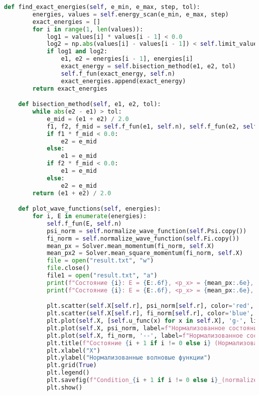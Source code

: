 \begin{lstlisting}[language=Python, caption=Код файла solver.py,label={lst:solver}]
    def find_exact_energies(self, e_min, e_max, step, tol):
        energies, values = self.energy_scan(e_min, e_max, step)
        exact_energies = []
        for i in range(1, len(values)):
            log1 = values[i] * values[i - 1] < 0.0
            log2 = np.abs(values[i] - values[i - 1]) < self.limit_value
            if log1 and log2:
                e1, e2 = energies[i - 1], energies[i]
                exact_energy = self.bisection_method(e1, e2, tol)
                self.f_fun(exact_energy, self.n)
                exact_energies.append(exact_energy)
        return exact_energies

    def bisection_method(self, e1, e2, tol):
        while abs(e2 - e1) > tol:
            e_mid = (e1 + e2) / 2.0
            f1, f2, f_mid = self.f_fun(e1, self.n), self.f_fun(e2, self.n), self.f_fun(e_mid, self.n)
            if f1 * f_mid < 0.0:
                e2 = e_mid
            else:
                e1 = e_mid
            if f2 * f_mid < 0.0:
                e1 = e_mid
            else:
                e2 = e_mid
        return (e1 + e2) / 2.0

    def plot_wave_functions(self, energies):
        for i, E in enumerate(energies):
            self.f_fun(E, self.n)
            psi_norm = self.normalize_wave_function(self.Psi.copy())
            fi_norm = self.normalize_wave_function(self.Fi.copy())
            mean_px = Solver.mean_momentum(fi_norm, self.X)
            mean_px2 = Solver.mean_square_momentum(fi_norm, self.X)
            file = open("result.txt", "w")
            file.close()
            file1 = open("result.txt", "a")
            print(f"Состояние {i}: E = {E:.6f}, <p_x> = {mean_px:.6e}, <p_x^2> = {mean_px2:.6e}")
            print(f"Состояние {i}: E = {E:.6f}, <p_x> = {mean_px:.6e}, <p_x^2> = {mean_px2:.6e}", file = file1)

            plt.scatter(self.X[self.r], psi_norm[self.r], color='red', s=50, zorder=5)  # Точка на Psi
            plt.scatter(self.X[self.r], fi_norm[self.r], color='blue', s=50, zorder=5)  # Точка на Fi
            plt.plot(self.X, [self.u_func(x) for x in self.X], 'g-', linewidth=6.0, label="U(x)")
            plt.plot(self.X, psi_norm, label=f"Нормализованное состояние Пси {i+1}")
            plt.plot(self.X, fi_norm, '--', label=f"Нормализованное состояние Фи {i+1}")
            plt.title(f"Состояние {i + 1 if i != 0 else i} (Нормализованное) при E = {E:.4f}")
            plt.xlabel("X")
            plt.ylabel("Нормализованные волновые функции")
            plt.grid(True)
            plt.legend()
            plt.savefig(f"Condition_{i + 1 if i != 0 else i}_(normalized).jpg", dpi=300)
            plt.show()



\end{lstlisting}
